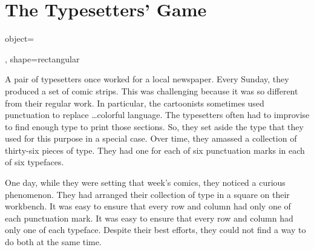 \documentclass[a4paper, DIV=15]{scrartcl}
\newlength{\wlen}
\newlength{\llen}
\begin{document}
\section*{The Typesetters' Game}
\begin{pullquote}
{object={
},
shape=rectangular}
A pair of typesetters once worked for a local newspaper. Every Sunday, they produced a set of comic strips. This was challenging because it was so different from their regular work. In particular, the cartoonists sometimes used punctuation to replace \ldots colorful language. The typesetters often had to improvise to find enough type to print those sections. So, they set aside the type that they used for this purpose in a special case. Over time, they amassed a collection of thirty-six pieces of type. They had one for each of six punctuation marks in each of six typefaces.

One day, while they were setting that week's comics, they noticed a curious phenomenon. They had arranged their collection of type in a square on their workbench. It was easy to ensure that every row and column had only one of each punctuation mark. It was easy to ensure that every row and column had only one of each typeface. Despite their best efforts, they could not find a way to do both at the same time.


\end{pullquote}
\end{document}
